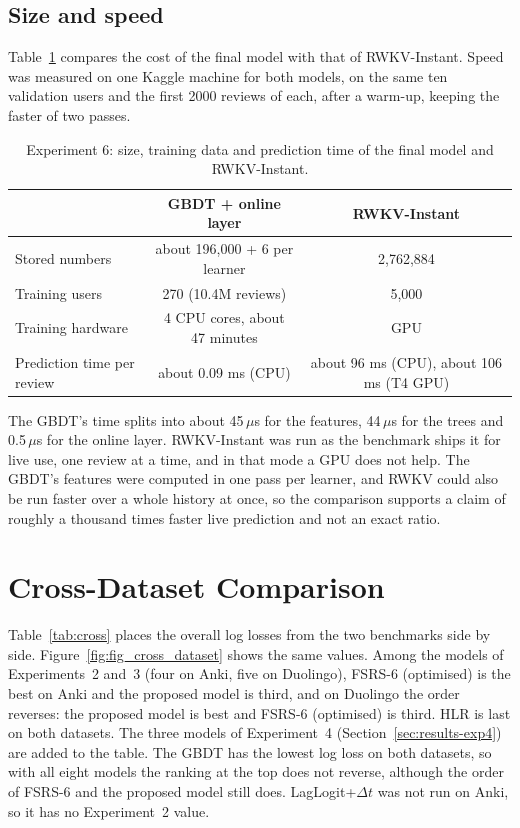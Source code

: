 \subsection{Size and speed}
\label{sec:results-exp6-cost}

Table~\ref{tab:exp6-cost} compares the cost of the final model with that of RWKV-Instant. Speed was measured on one Kaggle
machine for both models, on the same ten validation users and the first 2000 reviews of each, after a warm-up, keeping the
faster of two passes.

\begin{table}[htbp]
  \centering
  \caption[Experiment 6: size and speed]{Experiment 6: size, training data and prediction time of the final model and RWKV-Instant.}
  \label{tab:exp6-cost}
  \begin{tabular}{@{}lcc@{}}
    \toprule
    & GBDT + online layer & RWKV-Instant \\
    \midrule
    Stored numbers & about 196,000 + 6 per learner & 2,762,884 \\
    Training users & 270 (10.4M reviews) & 5,000 \\
    Training hardware & 4 CPU cores, about 47 minutes & GPU \\
    Prediction time per review & about 0.09 ms (CPU) & about 96 ms (CPU), about 106 ms (T4 GPU) \\
    \bottomrule
  \end{tabular}
\end{table}

The GBDT's time splits into about 45\,$\mu$s for the features, 44\,$\mu$s for the trees and 0.5\,$\mu$s for the online
layer. RWKV-Instant was run as the benchmark ships it for live use, one review at a time, and in that mode a GPU does not help.
The GBDT's features were computed in one pass per learner, and RWKV could also be run faster over a whole history at once, so
the comparison supports a claim of roughly a thousand times faster live prediction and not an exact ratio.

\section{Cross-Dataset Comparison}
\label{sec:results-cross}

Table~\ref{tab:cross} places the overall log losses from the two benchmarks side by side. Figure~\ref{fig:fig_cross_dataset}
shows the same values. Among the models of Experiments~2 and~3 (four on Anki, five on Duolingo), FSRS-6 (optimised) is the best on Anki and the proposed model is third, and on Duolingo the
order reverses: the proposed model is best and FSRS-6 (optimised) is third. HLR is last on both datasets. The three models of Experiment~4 (Section~\ref{sec:results-exp4}) are added to the table.
The GBDT has the lowest log loss on both datasets, so with all eight models the ranking at the top does not reverse, although the order of FSRS-6 and the proposed model still does. LagLogit+$\Delta t$
was not run on Anki, so it has no Experiment~2 value.

